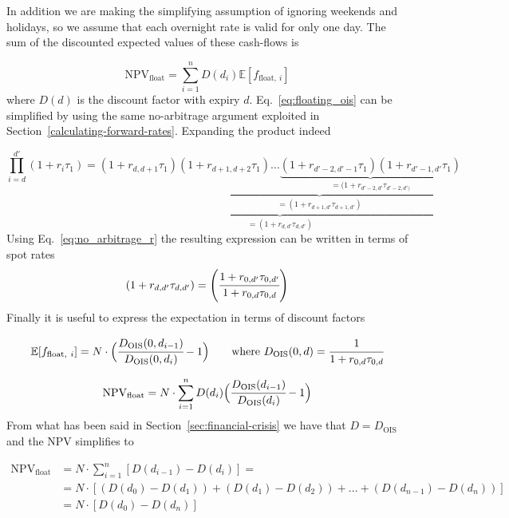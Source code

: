 In addition we are making the simplifying assumption of ignoring weekends and holidays, so we assume that each overnight rate is valid for only one day. The sum of the discounted expected values of these cash-flows is

\begin{equation}
\mathrm{NPV}_{\mathrm{float}} = \sum_{i=1}^{n}D(d_i)\mathbb{E}[f_{\mathrm{float},~i}]
\end{equation}
where $D(d)$ is the discount factor with expiry $d$. Eq.~\ref{eq:floating_ois} can be simplified by using the same no-arbitrage argument exploited in Section~\ref{calculating-forward-rates}. Expanding the product indeed

\begin{equation*}
\prod_{i=d}^{d'} (1+r_i\tau_1) = \underbrace{(1+r_{d,d+1}\tau_1)\underbrace{(1+r_{d+1,d+2}\tau_1)\ldots\underbrace{(1+r_{d'-2,d'-1}\tau_1)(1+r_{d'-1,d'}\tau_1)}_{\textstyle =(1+r_{d'-2,d'}\tau_{d'-2,d')}}}_{\textstyle =(1+r_{d+1,d'}\tau_{d+1, d'})}}_{\textstyle =(1+r_{d,d'}\tau_{d,d'})}
\end{equation*}
\noindent
Using Eq.~\ref{eq:no_arbitrage_r} the resulting expression can be written in terms of spot rates
\begin{equation*}
(1+r_{d,d'}\tau_{d,d'}) = \left(\cfrac{1+r_{0, d'}\tau_{0,d'}}{1+r_{0,d}\tau_{0,d}}\right)
\end{equation*}
\noindent Finally it is useful to express the expectation in terms of discount factors

\begin{equation*}
\mathbb{E}[f_{\mathrm{float},~i}] = N\cdot\Big(\cfrac{D_{\mathrm{OIS}}(0, d_{i-1})}{D_{\mathrm{OIS}}(0, d_{i})} - 1\Big)\qquad \mathrm{where}\ D_{\mathrm{OIS}}(0,d)=\cfrac{1}{1+r_{0,d}\tau_{0,d}}
\end{equation*}

\begin{equation*}
\mathrm{NPV}_{\mathrm{float}} = N\cdot \sum_{i=1}^{n}D(d_i) \Big(\cfrac{D_{\mathrm{OIS}}(d_{i-1})}{D_{\mathrm{OIS}}(d_{i})} - 1\Big)
\end{equation*}
From what has been said in Section~\ref{sec:financial-crisis} we have that $D = D_{\mathrm{OIS}}$ and the NPV simplifies to

\begin{equation}
	\begin{split}
		\mathrm{NPV}_{\mathrm{float}} & = N\cdot\sum_{i=1}^{n}[D(d_{i-1}) - D(d_i)] =  \\
		&= N\cdot[(D(d_{0}) - D(d_{1})) + (D(d_{1}) - D(d_{2})) + ... + (D(d_{n-1}) - D(d_{n}))]\\
		&= N \cdot [D(d_0) - D(d_n)]
	\end{split}
\end{equation}

